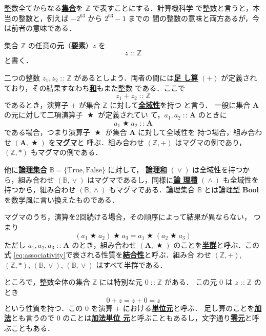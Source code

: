 \documentclass[a5paper,twoside,fleqn,draft]{jsbook}
\newcommand{\keyword}[1]{{\underline{\textbf{#1}}}}
\newcommand{\mSpecialConstant}[1]{\textrm{#1}} %
\newcommand{\mFalse}{\mSpecialConstant{False}}
\newcommand{\mTrue}{\mSpecialConstant{True}}
\DeclareMathOperator{\mBinOp}{\bigstar}
\DeclareMathOperator{\mIn}{{:\!:}}
\DeclareMathOperator{\mLogicalAnd}{\wedge}
\DeclareMathOperator{\mLogicalOr}{\vee}
\newcommand{\mSet}[1]{\mathbf{#1}}
\newcommand{\mSpecialSet}[1]{\mathbb{#1}} %
\newcommand{\mBSet}{\mSpecialSet{B}}
\newcommand{\mZSet}{\mSpecialSet{Z}}
\newcommand{\mType}[1]{\mathbf{#1}}
\newcommand{\mBoolType}{\mType{Bool}}
\newcommand{\mTupleWith}[1]{\left(#1\right)}
\begin{document}
整数全てからなる\keyword{集合}を $\mZSet$ で表すことにする．計算機科学
で整数と言うと，本当の整数と，例えば $-2^{63}$ から $2^{63}-1$ までの
間の整数の意味と両方あるが，今は前者の意味である．

集合 $\mZSet$ の任意の\keyword{元}（\keyword{要素}）$z$ を
\begin{equation}
z\mIn\mZSet
\end{equation}
と書く．

二つの整数 $z_1,z_2\mIn\mZSet$ があるとしよう．両者の間には\keyword{足
  し算} $(+)$ が定義されており，その結果すなわち\keyword{和}もまた整数
である．ここで
\begin{equation}
z_1+z_2\mIn\mZSet
\end{equation}
であるとき，演算子 $+$ が集合 $\mZSet$ に対して\keyword{全域性}を持つ
と言う．
一般に集合 $\mSet{A}$ の元に対して二項演算子 $\mBinOp$ が定義されてい
て，$a_1,a_2\mIn\mSet{A}$ のときに
\begin{equation}
\label{eq:totality}
a_1\mBinOp a_2\mIn\mSet{A}
\end{equation}
である場合，つまり演算子 $\mBinOp$ が集合 $\mSet{A}$ に対して全域性を
持つ場合，組み合わせ $\mTupleWith{\mSet{A},\mBinOp}$ を\keyword{マグマ}と
呼ぶ．組み合わせ $\mTupleWith{\mZSet,+}$ はマグマの例であり，
$\mTupleWith{\mZSet,*}$ もマグマの例である．

他に\keyword{論理集合} $\mBSet=\{\mTrue,\mFalse\}$ に対して，
\keyword{論理和} $(\mLogicalOr)$ は全域性を持つから，組み合わせ
$\mTupleWith{\mBSet,\mLogicalOr}$ はマグマであるし，同様に\keyword{論
  理積} $(\mLogicalAnd)$ も全域性を持つから，組み合わせ
$\mTupleWith{\mBSet,\mLogicalAnd}$ もマグマである．論理集合 $\mBSet$
とは論理型 $\mBoolType$ を数学風に言い換えたものである．

マグマのうち，演算を2回続ける場合，その順序によって結果が異ならない，
つまり
\begin{equation}
\label{eq:associativity}
\left(a_1\mBinOp a_2\right)\mBinOp a_3
=a_1\mBinOp\left(a_2\mBinOp{a_3}\right)
\end{equation}
ただし $a_1,a_2,a_3\mIn\mSet{A}$ のとき，組み合わせ
$\mTupleWith{\mSet{A},\mBinOp}$ のことを\keyword{半群}と呼ぶ．この式
\eqref{eq:associativity}で表される性質を\keyword{結合性}と呼ぶ．組み合
わせ $\mTupleWith{\mZSet,+}$, $\mTupleWith{\mZSet,*}$,
$\mTupleWith{\mBSet,\mLogicalOr}$, $\mTupleWith{\mBSet,\mLogicalOr}$
はすべて半群である．

ところで，整数全体の集合 $\mZSet$ には特別な元 $0\mIn\mZSet$ がある．
この元 $0$ は $z\mIn\mZSet$ のとき
\begin{equation}
0+z=z+0=z
\end{equation}
という性質を持つ．この $0$ を演算 $+$ における\keyword{単位元}と呼ぶ．
足し算のことを\keyword{加法}とも言うので $0$ のことは\keyword{加法単位
  元}と呼ぶこともあるし，文字通り\keyword{零元}と呼ぶこともある．
\end{document}
